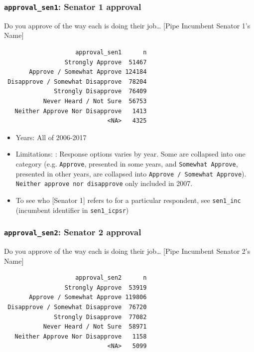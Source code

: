 \documentclass[10pt,article,oneside]{memoir}
\theoremstyle{definition}
\begin{document}
\subsubsection{\texorpdfstring{\texttt{approval\_sen1}: Senator 1
approval}{approval\_sen1: Senator 1 approval}}\label{approval_sen1-senator-1-approval}

Do you approve of the way each is doing their job\ldots{} {[}Pipe
Incumbent Senator 1's Name{]}

\begin{verbatim}
                    approval_sen1      n
                 Strongly Approve  51467
       Approve / Somewhat Approve 124184
 Disapprove / Somewhat Disapprove  78204
              Strongly Disapprove  76409
           Never Heard / Not Sure  56753
   Neither Approve Nor Disapprove   1413
                             <NA>   4325
\end{verbatim}

\begin{itemize}
\tightlist
\item
  Years: All of 2006-2017
\item
  Limitations: : Response options varies by year. Some are collapsed
  into one category (e.g. \texttt{Approve}, presented in some years, and
  \texttt{Somewhat\ Approve}, presented in other years, are collapsed
  into \texttt{Approve\ /\ Somewhat\ Approve}).
  \texttt{Neither\ approve\ nor\ disapprove} only included in 2007.
\item
  To see who {[}Senator 1{]} refers to for a particular respondent, see
  \texttt{sen1\_inc} (incumbent identifier in \texttt{sen1\_icpsr})
\end{itemize}

\subsubsection{\texorpdfstring{\texttt{approval\_sen2}: Senator 2
approval}{approval\_sen2: Senator 2 approval}}\label{approval_sen2-senator-2-approval}

Do you approve of the way each is doing their job\ldots{} {[}Pipe
Incumbent Senator 2's Name{]}

\begin{verbatim}
                    approval_sen2      n
                 Strongly Approve  53919
       Approve / Somewhat Approve 119806
 Disapprove / Somewhat Disapprove  76720
              Strongly Disapprove  77082
           Never Heard / Not Sure  58971
   Neither Approve Nor Disapprove   1158
                             <NA>   5099
\end{verbatim}
\end{document}
